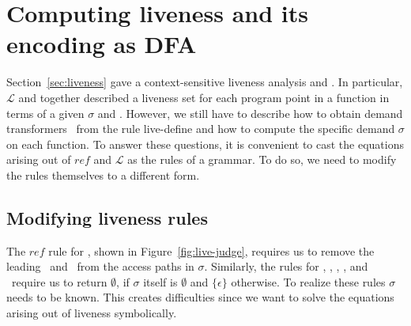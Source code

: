 \documentclass[9pt]{sigplanconf}
\newcommand{\mycomment}[1]{}
\begin{document}
\section{Computing liveness and its encoding as DFA}\label{sec:computing}
Section~\ref{sec:liveness} gave  a context-sensitive liveness analysis
and  \mycomment{\color  {red}  proved  it  correct  with  reference  to  a  {\em
    minefield} semantics}.  In  particular, $\mathcal{L}$ and 
together described a liveness set for each program point in a function
in terms of  a given $\sigma$ and \Lfonly.  However,  we still have to
describe how to obtain demand transformers \Lfonly\ from the rule {\sc
  live-define} and how to compute the specific demand $\sigma$ on each
function.
To  answer these  questions, it  is convenient  to cast  the equations
arising  out of  $\mathit{ref}$ and  $\mathcal{L}$ as  the rules  of a
grammar.   To do  so, we  need  to modify  the rules  themselves to  a
different form.

\subsection{Modifying liveness rules}

The      $\mathit{ref}$     rule      for     \CONS,      shown     in
Figure~\ref{fig:live-judge},  requires   us  to  remove   the  leading
\acar\ and \acdr\  from the access paths in  $\sigma$.  Similarly, the
rules for  \CAR, \CDR, \PRIM, \NULLQ,  and \SIF\ require  us to return
$\emptyset$, if  $\sigma$ itself is $\emptyset$ and
$\lbrace\epsilon\rbrace$ otherwise.  To  realize these rules
$\sigma$ needs to be known. This creates difficulties since we want to
solve the equations arising out of liveness symbolically.
\end{document}
